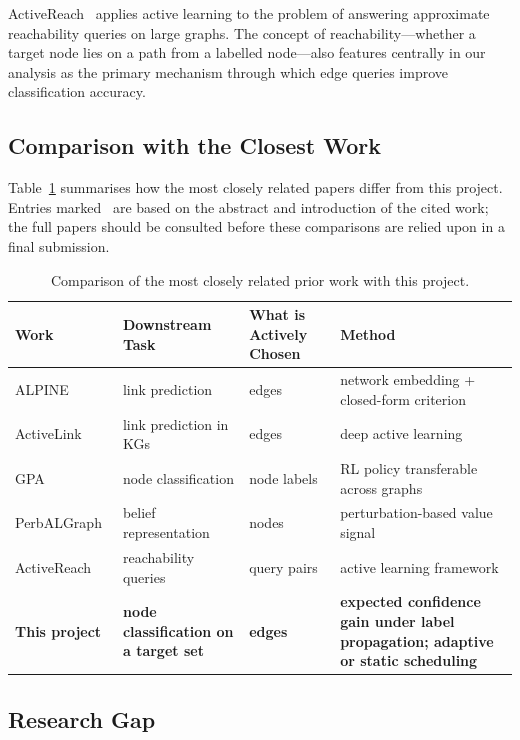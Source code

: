 \documentclass[11pt,a4paper]{article}
\newif\ifshowverify
\newcommand{\verify}{\ifshowverify\textcolor{red}{\textsuperscript{[verify]}}\fi}
\begin{document}
ActiveReach~\cite{activereach} applies active learning to the problem of answering approximate
reachability queries on large graphs\verify. The concept of reachability---whether a target node
lies on a path from a labelled node---also features centrally in our analysis as the primary
mechanism through which edge queries improve classification accuracy.

\subsection{Comparison with the Closest Work}

Table~\ref{tab:related} summarises how the most closely related papers differ from this project.
Entries marked \verify\ are based on the abstract and introduction of the cited work; the full
papers should be consulted before these comparisons are relied upon in a final submission.

\begin{table}[htbp]
\centering
\caption{Comparison of the most closely related prior work with this project.}
\label{tab:related}
\small
\begin{tabularx}{\textwidth}{>{\raggedright\arraybackslash}p{2.6cm}>{\raggedright\arraybackslash}X>{\raggedright\arraybackslash}X>{\raggedright\arraybackslash}X}
\toprule
Work & Downstream Task & What is Actively Chosen & Method\\
\midrule
ALPINE~\cite{alpine} & link prediction & edges & network embedding + closed-form criterion\\
ActiveLink~\cite{activelink}\verify & link prediction in KGs & edges & deep active learning\\
GPA~\cite{gpa}\verify & node classification & node labels & RL policy transferable across graphs\\
PerbALGraph~\cite{perbal}\verify & belief representation & nodes & perturbation-based value signal\\
ActiveReach~\cite{activereach}\verify & reachability queries & query pairs & active learning framework\\
\textbf{This project} & \textbf{node classification on a target set} & \textbf{edges} & \textbf{expected confidence gain under label propagation; adaptive or static scheduling}\\
\bottomrule
\end{tabularx}
\end{table}

\subsection{Research Gap}
\end{document}
